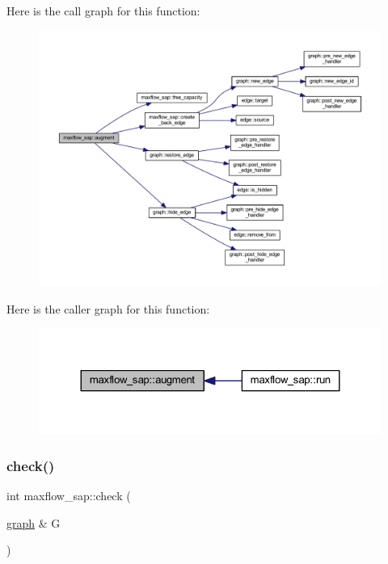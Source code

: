 Here is the call graph for this function\+:\nopagebreak
\begin{figure}[H]
\begin{center}
\leavevmode
\includegraphics[width=350pt]{classmaxflow__sap_a02f7814313a36b30bb99c40ead6c9ef5_cgraph}
\end{center}
\end{figure}
Here is the caller graph for this function\+:\nopagebreak
\begin{figure}[H]
\begin{center}
\leavevmode
\includegraphics[width=324pt]{classmaxflow__sap_a02f7814313a36b30bb99c40ead6c9ef5_icgraph}
\end{center}
\end{figure}
\mbox{\label{classmaxflow__sap_aa2974bf25fb597677848fdb23c12d338}} 
\subsubsection{\texorpdfstring{check()}{check()}}
{\footnotesize\ttfamily int maxflow\+\_\+sap\+::check (\begin{DoxyParamCaption}\item[{\mbox{\hyperlink{classgraph}{graph}} \&}]{G }\end{DoxyParamCaption})\hspace{0.3cm}{\ttfamily [virtual]}}

